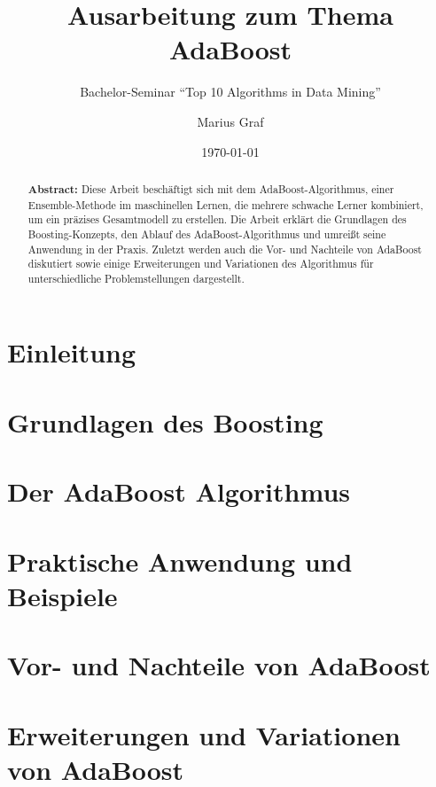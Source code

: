 \documentclass[11pt,a4paper,oneside]{scrartcl}
\begin{document}
\title{Ausarbeitung zum Thema AdaBoost}
\subtitle{Bachelor-Seminar "`Top 10 Algorithms in Data Mining"'}

\author{Marius Graf}
\date{\today}

\maketitle

\tableofcontents

\begin{abstract}
    \noindent\textbf{Abstract:}
    Diese Arbeit beschäftigt sich mit dem AdaBoost-Algorithmus, einer Ensemble-Methode im maschinellen
    Lernen, die mehrere schwache Lerner kombiniert, um ein präzises Gesamtmodell zu erstellen. Die Arbeit
    erklärt die Grundlagen des Boosting-Konzepts, den Ablauf des AdaBoost-Algorithmus und umreißt seine Anwendung in
    der Praxis. Zuletzt werden auch die Vor- und Nachteile von AdaBoost diskutiert sowie einige Erweiterungen und Variationen
    des Algorithmus für unterschiedliche Problemstellungen dargestellt.
\end{abstract}
\newpage

\section{Einleitung}

\section{Grundlagen des Boosting}

\section{Der AdaBoost Algorithmus}

\section{Praktische Anwendung und Beispiele}

\section{Vor- und Nachteile von AdaBoost}

\section{Erweiterungen und Variationen von AdaBoost}

\newpage
% 


\end{document}
